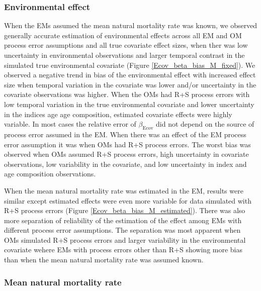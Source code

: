 \documentclass[
  12pt,
]{article}
\begin{document}
\hypertarget{environmental-effect}{%
\subsubsection*{Environmental effect}\label{environmental-effect}}

When the EMs assumed the mean natural mortality rate was known, we
observed generally accurate estimation of environmental effects across
all EM and OM process error assumptions and all true covariate effect
sizes, when ther was low uncertainty in environmental observations and
larger temporal contrast in the simulated true environmental covariate
(Figure \ref{Ecov_beta_bias_M_fixed}). We observed a negative trend in
bias of the environmental effect with increased effect size when
temporal variation in the covariate was lower and/or uncertainty in the
covariate observations was higher. When the OMs had R+S process errors
with low temporal variation in the true environmental covariate and
lower uncertainty in the indices age age composition, estimated
covariate effects were highly variable. In most cases the relative error
of \(\beta_\text{Ecov}\) did not depend on the source of process error
assumed in the EM. When there was an effect of the EM process error
assumption it was when OMs had R+S process errors. The worst bias was
observed when OMs assumed R+S process errors, high uncertainty in
covariate observations, low variability in the covariate, and low
uncertainty in index and age composition observations.

When the mean natural mortality rate was estimated in the EM, results
were similar except estimated effects were even more variable for data
simulated with R+S process errors (Figure
\ref{Ecov_beta_bias_M_estimated}). There was also more separation of
reliability of the estimation of the effect among EMs with different
process error assumptions. The separation was most apparent when OMs
simulated R+S process errors and larger variability in the environmental
covariate wehere EMs with process errors other than R+S showing more
bias than when the mean natural mortality rate was assumed known.

\hypertarget{mean-natural-mortality-rate}{%
\subsubsection*{Mean natural mortality
rate}\label{mean-natural-mortality-rate}}
\end{document}
